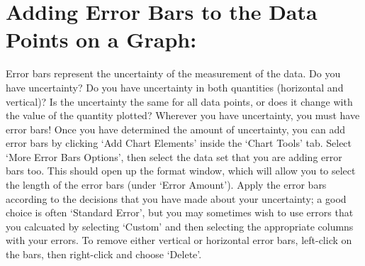 \section*{Adding Error Bars to the Data Points on a Graph:}
Error bars represent the uncertainty of the measurement of the data. 
Do you have uncertainty? 
Do you have uncertainty in both quantities (horizontal and vertical)? 
Is the uncertainty the same for all data points, or does it change with the value of the quantity plotted? 
Wherever you have uncertainty, you must have error bars! 
Once you have determined the amount of uncertainty, you can add error bars by clicking `Add Chart Elements' inside the `Chart Tools' tab. 
Select `More Error Bars Options', then select the data set that you are adding error bars too.
This should open up the format window, which will allow you to select the length of the error bars (under `Error Amount').
Apply the error bars according to the decisions that you have made about your uncertainty; a good choice is often `Standard Error', but you may sometimes wish to use errors that you calcuated by selecting `Custom' and then selecting the appropriate columns with your errors. 
To remove either vertical or horizontal error bars, left-click on the bars, then right-click and choose `Delete'.

